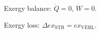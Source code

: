 Exergy balance:  
\( \dot{Q} = 0 \), \( \dot{W} = 0 \).  

Exergy loss:  
\( \Delta ex_{\text{STR}} = ex_{\text{VERL}} \).